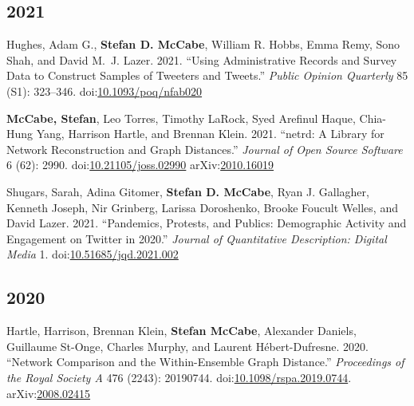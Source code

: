 \documentclass[11pt, letter]{article}
\begin{document}
\subsection{2021}
\begin{hangparas}{.25in}{1}
Hughes, Adam G.,\textsuperscript{\textdagger} \textbf{Stefan D. McCabe},\textsuperscript{\textdagger} William R. Hobbs, Emma Remy, Sono Shah, and David M.~J. Lazer. 2021. ``Using Administrative Records and Survey Data to Construct Samples of Tweeters and Tweets.'' \textit{Public Opinion Quarterly} 85 (S1): 323--346. doi:\href{https://doi.org/10.1093/poq/nfab020}{10.1093/poq/nfab020}
\vspace{-1mm}

\textbf{McCabe, Stefan}, Leo Torres, Timothy LaRock, Syed Arefinul Haque, Chia-Hung Yang, Harrison Hartle, and Brennan Klein. 2021. ``netrd: A Library for Network Reconstruction and Graph Distances.'' \textit{Journal of Open Source Software} 6 (62): 2990. doi:\href{https://doi.org/10.21105/joss.02990}{10.21105/joss.02990} arXiv:\href{https://arxiv.org/abs/2010.16019}{2010.16019}
\vspace{-1mm}

Shugars, Sarah, Adina Gitomer, \textbf{Stefan D. McCabe}, Ryan J. Gallagher, Kenneth Joseph, Nir Grinberg, Larissa Doroshenko, Brooke Foucult Welles, and David Lazer. 2021. ``Pandemics, Protests, and Publics: Demographic Activity and Engagement on Twitter in 2020.'' \textit{Journal of Quantitative Description: Digital Media} 1. doi:\href{https://doi.org/10.51685/jqd.2021.002}{10.51685/jqd.2021.002}
\vspace{2mm}
\end{hangparas}

\subsection{2020}
\begin{hangparas}{.25in}{1}
  Hartle, Harrison, Brennan Klein, \textbf{Stefan McCabe}, Alexander Daniels, Guillaume St-Onge, Charles Murphy, and Laurent Hébert-Dufresne. 2020. ``Network Comparison and the Within-Ensemble Graph Distance.'' \textit{Proceedings of the Royal Society A} 476 (2243): 20190744. doi:\href{https://doi.org/10.1098/rspa.2019.0744}{10.1098/rspa.2019.0744}. arXiv:\href{https://arxiv.org/abs/2008.02415}{2008.02415} \vspace{2mm}
\end{hangparas}

\end{document}
